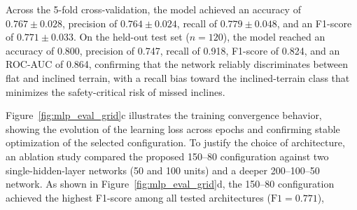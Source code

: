 Across the 5-fold cross-validation, the model achieved an accuracy of $0.767 \pm 0.028$, precision of $0.764 \pm 0.024$, recall of $0.779 \pm 0.048$, and an F1-score of $0.771 \pm 0.033$. On the held-out test set ($n = 120$), the model reached an accuracy of 0.800, precision of 0.747, recall of 0.918, F1-score of 0.824, and an ROC-AUC of 0.864, confirming that the network reliably discriminates between flat and inclined terrain, with a recall bias toward the inclined-terrain class that minimizes the safety-critical risk of missed inclines. 

Figure~\ref{fig:mlp_eval_grid}c illustrates the training convergence behavior, showing the evolution of the learning loss across epochs and confirming stable optimization of the selected configuration. To justify the choice of architecture, an ablation study compared the proposed 150--80 configuration against two single-hidden-layer networks (50 and 100 units) and a deeper 200--100--50 network. As shown in Figure~\ref{fig:mlp_eval_grid}d, the 150--80 configuration achieved the highest F1-score among all tested architectures ($\text{F1} = 0.771$), 

